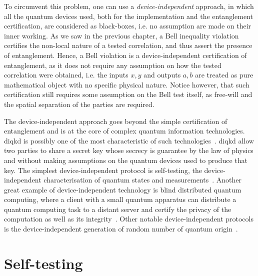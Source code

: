 To circumvent this problem, one can use a \textit{device-independent} approach, in which all the quantum devices used, both for the implementation and the entanglement certification, are considered as black-boxes, i.e. no assumption are made on their inner working.
As we saw in the previous chapter, a Bell inequality violation certifies the non-local nature of a tested correlation, and thus assert the presence of entanglement.
Hence, a Bell violation is a device-independent certification of entanglement, as it does not require any assumption on how the tested correlation were obtained, i.e. the inputs $x,y$ and outputs $a,b$ are treated as pure mathematical object with no specific physical nature.
Notice however, that such certification still requires some assumption on the Bell test itself, as free-will and the spatial separation of the parties are required.

\medbreak

The device-independent approach goes beyond the simple certification of entanglement and is at the core of complex quantum information technologies.
\acrfull{diqkd} is possibly one of the most characteristic of such technologies~\cite{Pironio2009,Nadlinger2022}.
\acrshort{diqkd} allow two parties to share a secret key whose secrecy is guarantee by the law of physics and without making assumptions on the quantum devices used to produce that key.
The simplest device-independent protocol is self-testing, the device-independent characterisation of quantum states and measurements~\cite{Supic2019}.
Another great example of device-independent technology is blind distributed quantum computing, where a client with a small quantum apparatus can distribute a quantum computing task to a distant server and certify the privacy of the computation as well as its integrity~\cite{Fitzsimons2017}.
Other notable device-independent protocols is the device-independent generation of random number of quantum origin~\cite{Liu2018}.

\section{Self-testing}

